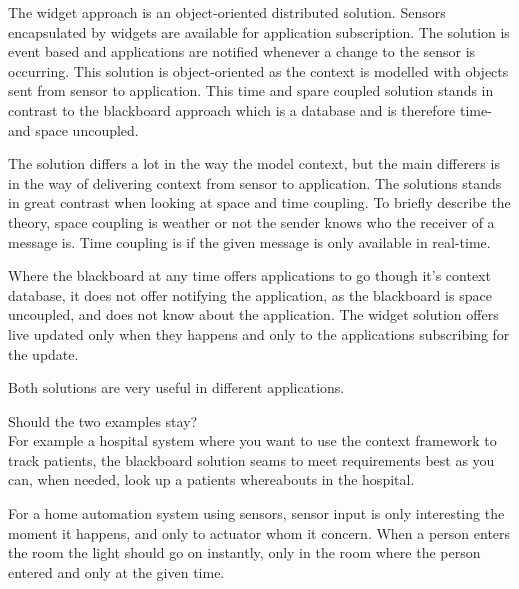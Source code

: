 \documentclass[../report.tex]{subfiles}
\begin{document}
The widget approach is an object-oriented distributed solution. Sensors encapsulated by widgets are available for application subscription. The solution is event based and applications are notified whenever a change to the sensor is occurring. This solution is object-oriented as the context is modelled with objects sent from sensor to application. This time and spare coupled solution stands in contrast to the blackboard approach which is a database and is therefore time- and space uncoupled.

The solution differs a lot in the way the model context, but the main differers is in the way of delivering context from sensor to application. The solutions stands in great contrast when looking at space and time coupling. To briefly describe the theory, space coupling is weather or not the sender knows who the receiver of a message is. Time coupling is if the given message is only available in real-time. 

Where the blackboard at any time offers applications to go though it's context database, it does not offer notifying the application, as the blackboard is space uncoupled, and does not know about the application. The widget solution offers live updated only when they happens and only to the applications subscribing for the update.

Both solutions are very useful in different applications.

\todo Should the two examples stay?\\
For example a hospital system where you want to use the context framework to track patients, the blackboard solution seams to meet requirements best as you can, when needed, look up a patients whereabouts in the hospital.

For a home automation system using sensors, sensor input is only interesting the moment it happens, and only to actuator whom it concern. When a person enters the room the light should go on instantly, only in the room where the person entered and only at the given time. 
\end{document}
